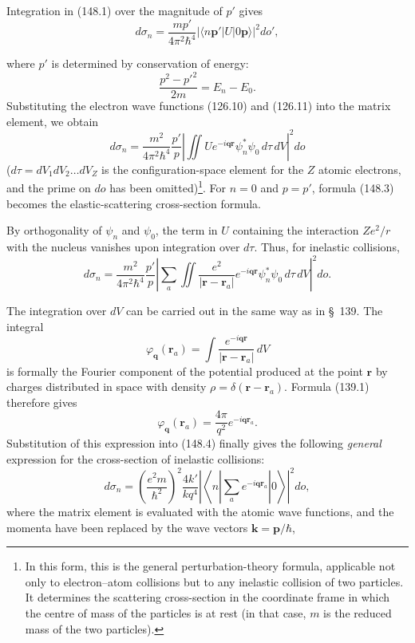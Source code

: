 Integration in (148.1) over the magnitude of $p'$ gives
\[
 d\sigma_n=\frac{mp'}{4\pi^2\hbar^4}|\langle n\mathbf p'|U|0\mathbf p\rangle|^2do',
\]

where $p'$ is determined by conservation of energy:
\begin{equation}
 \frac{p^2-p'^2}{2m}=E_n-E_0.
 \tag{148.2}
\end{equation}
Substituting the electron wave functions (126.10) and (126.11) into the matrix element, we obtain
\begin{equation}
 d\sigma_n=\frac{m^2}{4\pi^2\hbar^4}\frac{p'}p
 \left|\iint Ue^{-i\mathbf q\mathbf r}\psi_n^*\psi_0\,d\tau\,dV\right|^2do
 \tag{148.3}
\end{equation}
($d\tau=dV_1dV_2\ldots dV_Z$ is the configuration-space element for the $Z$ atomic electrons, and the prime on $do$ has been omitted)\footnote{In this form, this is the general perturbation-theory formula, applicable not only to electron--atom collisions but to any inelastic collision of two particles. It determines the scattering cross-section in the coordinate frame in which the centre of mass of the particles is at rest (in that case, $m$ is the reduced mass of the two particles).}. For $n=0$ and $p=p'$, formula (148.3) becomes the elastic-scattering cross-section formula.

By orthogonality of $\psi_n$ and $\psi_0$, the term in $U$ containing the interaction $Ze^2/r$ with the nucleus vanishes upon integration over $d\tau$. Thus, for inelastic collisions,
\begin{equation}
 d\sigma_n=\frac{m^2}{4\pi^2\hbar^4}\frac{p'}p
 \left|\sum_a\iint\frac{e^2}{|\mathbf r-\mathbf r_a|}e^{-i\mathbf q\mathbf r}
 \psi_n^*\psi_0\,d\tau\,dV\right|^2do.
 \tag{148.4}
\end{equation}

The integration over $dV$ can be carried out in the same way as in \S~139. The integral
\[
 \varphi_{\mathbf q}(\mathbf r_a)=\int\frac{e^{-i\mathbf q\mathbf r}}{|\mathbf r-\mathbf r_a|}\,dV
\]
is formally the Fourier component of the potential produced at the point $\mathbf r$ by charges distributed in space with density $\rho=\delta(\mathbf r-\mathbf r_a)$. Formula (139.1) therefore gives
\begin{equation}
 \varphi_{\mathbf q}(\mathbf r_a)=\frac{4\pi}{q^2}e^{-i\mathbf q\mathbf r_a}.
 \tag{148.5}
\end{equation}
Substitution of this expression into (148.4) finally gives the following \emph{general} expression for the cross-section of inelastic collisions:
\begin{equation}
 d\sigma_n=\left(\frac{e^2m}{\hbar^2}\right)^2\frac{4k'}{kq^4}
 \left|\left\langle n\left|\sum_a e^{-i\mathbf q\mathbf r_a}\right|0\right\rangle\right|^2do,
 \tag{148.6}
\end{equation}
where the matrix element is evaluated with the atomic wave functions, and the momenta have been replaced by the wave vectors $\mathbf k=\mathbf p/\hbar$,

